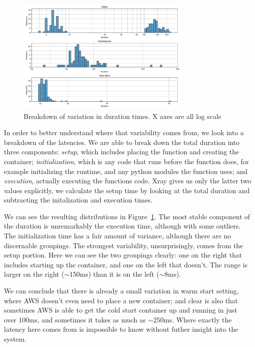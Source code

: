 \begin{figure}[t!]
  \centering
    \includegraphics[width=8.5cm]{img/lambda_duration_breakdown.png}
    \caption{ Breakdown of variation in duration times. X axes are all log scale }
  \label{fig:lambda-durations-breakdown}
\end{figure}

In order to better understand where that variability comes from, we look into a
breakdown of the latencies. We are able to break down the total duration into
three components: \textit{setup}, which includes placing the function and
creating the container; \textit{initialization}, which is any code that runs
before the function does, for example initializing the runtime, and any python
modules the function uses; and \textit{execution}, actually executing the
functions code. Xray gives us only the latter two values explicitly, we
calculate the setup time by looking at the total duration and subtracting the
initalization and execution times. 

We can see the resulting distributions in
Figure~\ref{fig:lambda-durations-breakdown}. The most stable component of the
duration is unremarkably the execution time, although with some outliers. The
initialization time has a fair amount of variance, although there are no
discernable groupings. The strongest variability, unsurprisingly, comes from the
setup portion. Here we can see the two groupings clearly: one on the right that
includes starting up the container, and one on the left that doesn't. The range
is larger on the right ($\sim$150ms) than it is on the left ($\sim$8ms).

We can conclude that there is already a small variation in warm start setting,
where AWS doesn't even need to place a new container; and clear is also that
sometimes AWS is able to get the cold start container up and running in just
over 100ms, and sometimes it takes as much as $\sim$250ms. Where exactly the
latency here comes from is impossible to know without futher insight into the
system.

